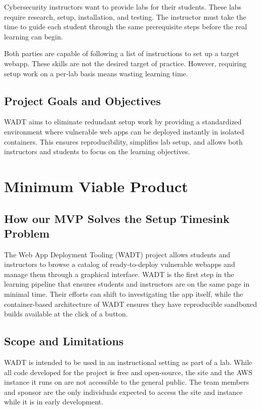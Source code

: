 \documentclass[12pt]{article}
\begin{document}
Cybersecurity instructors want to provide labs for their students. These labs require research, setup, installation, and testing. The instructor must take the time to guide each student through the same prerequisite steps before the real learning can begin.

Both parties are capable of following a list of instructions to set up a target webapp. These skills are not the desired target of practice. However, requiring setup work on a per-lab basis means wasting learning time.

\subsection{Project Goals and Objectives}
WADT aims to eliminate redundant setup work by providing a standardized environment where vulnerable web apps can be deployed instantly in isolated containers. This ensures reproducibility, simplifies lab setup, and allows both instructors and students to focus on the learning objectives.

\section{Minimum Viable Product}

\subsection{How our MVP Solves the Setup Timesink Problem}
The Web App Deployment Tooling (WADT) project allows students and instructors to browse a catalog of ready-to-deploy vulnerable webapps and manage them through a graphical interface. WADT is the first step in the learning pipeline that ensures students and instructors are on the same page in minimal time. Their efforts can shift to investigating the app itself, while the container-based architecture of WADT ensures they have reproducible sandboxed builds available at the click of a button.

\subsection{Scope and Limitations}
WADT is intended to be used in an instructional setting as part of a lab. While all code developed for the project is free and open-source, the site and the AWS instance it runs on are not accessible to the general public. The team members and sponsor are the only individuals expected to access the site and instance while it is in early development.
\end{document}
